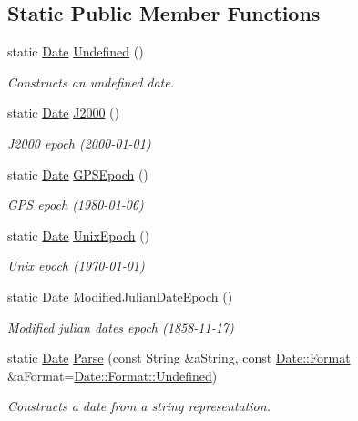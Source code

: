 \subsection*{Static Public Member Functions}
\begin{DoxyCompactItemize}
\item 
static \hyperlink{classlibrary_1_1physics_1_1time_1_1_date}{Date} \hyperlink{classlibrary_1_1physics_1_1time_1_1_date_a1fabcaeb4300781cc71e6cab35e158d1}{Undefined} ()
\begin{DoxyCompactList}\small\item\em Constructs an undefined date. \end{DoxyCompactList}\item 
static \hyperlink{classlibrary_1_1physics_1_1time_1_1_date}{Date} \hyperlink{classlibrary_1_1physics_1_1time_1_1_date_a9de63332b2eba91b697e7fa6bfbdf1c1}{J2000} ()
\begin{DoxyCompactList}\small\item\em J2000 epoch (2000-\/01-\/01) \end{DoxyCompactList}\item 
static \hyperlink{classlibrary_1_1physics_1_1time_1_1_date}{Date} \hyperlink{classlibrary_1_1physics_1_1time_1_1_date_ae76f9f45430ed0c6d56c36e32d0fa7c8}{G\+P\+S\+Epoch} ()
\begin{DoxyCompactList}\small\item\em G\+PS epoch (1980-\/01-\/06) \end{DoxyCompactList}\item 
static \hyperlink{classlibrary_1_1physics_1_1time_1_1_date}{Date} \hyperlink{classlibrary_1_1physics_1_1time_1_1_date_ac4279e501cf86444cce275776daa9b9c}{Unix\+Epoch} ()
\begin{DoxyCompactList}\small\item\em Unix epoch (1970-\/01-\/01) \end{DoxyCompactList}\item 
static \hyperlink{classlibrary_1_1physics_1_1time_1_1_date}{Date} \hyperlink{classlibrary_1_1physics_1_1time_1_1_date_adc0035184464f547f8c9528267109f0a}{Modified\+Julian\+Date\+Epoch} ()
\begin{DoxyCompactList}\small\item\em Modified julian dates epoch (1858-\/11-\/17) \end{DoxyCompactList}\item 
static \hyperlink{classlibrary_1_1physics_1_1time_1_1_date}{Date} \hyperlink{classlibrary_1_1physics_1_1time_1_1_date_a5bb194b5e97902e690bc216574396db1}{Parse} (const String \&a\+String, const \hyperlink{classlibrary_1_1physics_1_1time_1_1_date_a97671e22ec7b7825cf99ead6d86d0bf7}{Date\+::\+Format} \&a\+Format=\hyperlink{classlibrary_1_1physics_1_1time_1_1_date_a97671e22ec7b7825cf99ead6d86d0bf7aec0fc0100c4fc1ce4eea230c3dc10360}{Date\+::\+Format\+::\+Undefined})
\begin{DoxyCompactList}\small\item\em Constructs a date from a string representation. \end{DoxyCompactList}\end{DoxyCompactItemize}
